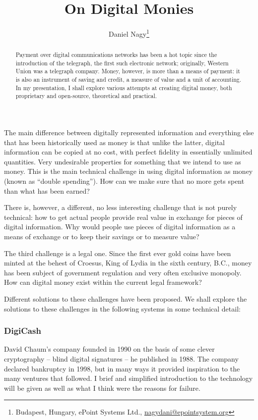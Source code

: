 \documentclass[10pt, a5paper]{article}
\begin{document}
\title{On Digital Monies}

\author{Daniel Nagy\footnote{Budapest, Hungary, ePoint Systems Ltd., \url{nagydani@epointsystem.org}}}
\date{}
\maketitle
\renewcommand{\abstractname}{Abstract}
\begin{abstract}
Payment over digital communications networks has been a hot topic since
the introduction of the telegraph, the first such electronic network;
originally, Western Union was a telegraph company. Money, however, is
more than a means of payment: it is also an instrument of saving and
credit, a measure of value and a unit of accounting. In my presentation,
I shall explore various attempts at creating digital money, both
proprietary and open-source, theoretical and practical.
\end{abstract}

The main difference between digitally represented information and
everything else that has been historically used as money is that unlike
the latter, digital information can be copied at no cost, with perfect
fidelity in essentially unlimited quantities. Very undesirable
properties for something that we intend to use as money. This is the
main technical challenge in using digital information as money (known as
``double spending''). How can we make sure that no more gets spent than
what has been earned?

There is, however, a different, no less interesting challenge that is
not purely technical: how to get actual people provide real value in
exchange for pieces of digital information. Why would people use pieces
of digital information as a means of exchange or to keep their savings
or to measure value?

The third challenge is a legal one. Since the first ever gold coins have
been minted at the behest of Croesus, King of Lydia in the sixth
century, B.C., money has been subject of government regulation and very
often exclusive monopoly. How can digital money exist within the current
legal framework?

Different solutions to these challenges have been proposed. We shall
explore the solutions to these challenges in the following systems in
some technical detail:

\subsubsection*{DigiCash}
David Chaum's company founded in 1990 on the basis of some clever
cryptography -- blind digital signatures -- he published in 1988. The
company declared bankruptcy in 1998, but in many ways it provided
inspiration to the many ventures that followed. I brief and simplified
introduction to the technology will be given as well as what I think
were the reasons for failure.
\end{document}
